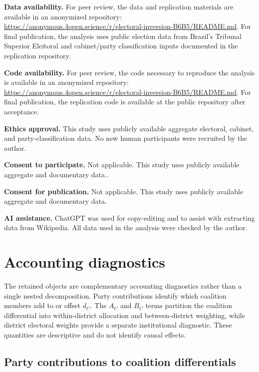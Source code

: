 \documentclass[11pt]{article}
\begin{document}
\textbf{Data availability.} For peer review, the data and replication materials are available in an anonymized repository: \url{https://anonymous.4open.science/r/electoral-inversion-B6B5/README.md}. For final publication, the analysis uses public election data from Brazil's Tribunal Superior Eleitoral and cabinet/party classification inputs documented in the replication repository.

\textbf{Code availability.} For peer review, the code necessary to reproduce the analysis is available in an anonymized repository: \url{https://anonymous.4open.science/r/electoral-inversion-B6B5/README.md}. For final publication, the replication code is available at the public repository after acceptance.

\textbf{Ethics approval.} This study uses publicly available aggregate electoral, cabinet, and party-classification data. No new human participants were recruited by the author. 

\textbf{Consent to participate.} Not applicable. This study uses publicly available aggregate and documentary data..

\textbf{Consent for publication.} Not applicable. This study uses publicly available aggregate and documentary data.

\textbf{AI assistance.} ChatGPT was used for copy-editing and to assist with extracting data from Wikipedia. All data used in the analysis were checked by the author.


\printbibliography


\appendix


\section{Accounting diagnostics}
\label{app:accounting-diagnostics}

The retained objects are complementary accounting diagnostics rather than a
single nested decomposition. Party contributions identify which coalition
members add to or offset \(d_C\). The \(A_C\) and \(B_C\) terms partition the
coalition differential into within-district allocation and between-district
weighting, while district electoral weights provide a separate institutional
diagnostic. These quantities are descriptive and do not identify causal
effects.

\subsection{Party contributions to coalition differentials}
\label{app:party-contributions}
\end{document}
